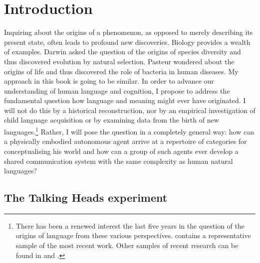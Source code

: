 \chapter{Introduction}
\label{c:introduction}
\setcounter{foot}{1}
Inquiring about the origins of a phenomenon, 
as opposed to merely describing its present state, often 
leads to profound new discoveries. Biology provides a 
wealth of examples. 
Darwin asked the question of the origins of species diversity and 
thus discovered evolution by natural selection. Pasteur
wondered about the origins of life and thus
discovered the role of bacteria in 
human diseases. My approach in this book is going to 
be similar. In order to advance our understanding 
of human language and cognition, I propose to address
the fundamental question how language 
and meaning might ever have originated. I will not do 
this by a historical reconstruction, nor by an 
empirical investigation of child language acquisition or 
by examining data from the birth of new
languages.\footnote{
There has been a renewed interest the last five
years in the 
question of the origins of language from these various 
perspectives. \cite{Hurford:1998} contains 
a representative sample of the most recent work. 
Other samples of recent research 
can be found in \cite{Hawkins:1992} and \cite{Velichkovsky:1996}. 
}
Rather, 
I will pose the question in a completely general way: 
how can a physically embodied autonomous agent  arrive 
at a repertoire of categories for conceptualising his
world and how can a group of such agents ever develop 
a shared communication system with the same complexity 
as human natural languages? 

\section{The Talking Heads experiment}

